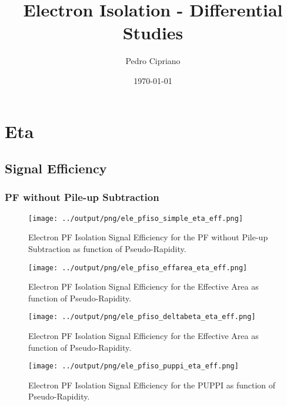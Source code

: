 \documentclass[11pt]{book}
\begin{document}
         
 
 \author{Pedro Cipriano}
 \date{\today}
 \title{Electron Isolation - Differential Studies}

\maketitle

\tableofcontents

\chapter{Eta}

\section{Signal Efficiency}
\subsection{PF without Pile-up Subtraction}
\begin{figure}[htb]
\centering
\texttt{[image: ../output/png/ele\_pfiso\_simple\_eta\_eff.png]}
\caption{Electron PF Isolation Signal Efficiency for the PF without Pile-up Subtraction as function of Pseudo-Rapidity.}
\label{fig:ele_pfiso_eta_eff_simple}
\end{figure}

\begin{figure}[htb]
\centering
\texttt{[image: ../output/png/ele\_pfiso\_effarea\_eta\_eff.png]}
\caption{Electron PF Isolation Signal Efficiency for the Effective Area as function of Pseudo-Rapidity.}
\label{fig:ele_pfiso_eta_eff_effarea}
\end{figure}

\begin{figure}[htb]
\centering
\texttt{[image: ../output/png/ele\_pfiso\_deltabeta\_eta\_eff.png]}
\caption{Electron PF Isolation Signal Efficiency for the Effective Area as function of Pseudo-Rapidity.}
\label{fig:ele_pfiso_eta_eff_deltabeta}
\end{figure}

\begin{figure}[htb]
\centering
\texttt{[image: ../output/png/ele\_pfiso\_puppi\_eta\_eff.png]}
\caption{Electron PF Isolation Signal Efficiency for the PUPPI as function of Pseudo-Rapidity.}
\label{fig:ele_pfiso_eta_eff_puppi}
\end{figure}
\end{document}
